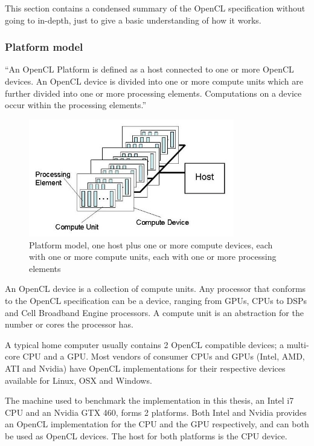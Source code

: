 This section contains a condensed summary of the OpenCL specification without
going to in-depth, just to give a basic understanding of how it works.

\subsubsection{Platform model}

``An OpenCL Platform is defined as a host connected to one or more OpenCL
devices. An OpenCL device is divided into one or more compute units which are
further divided into one or more processing elements. Computations on a device
occur within the processing elements.'' \cite{cl-spec}

\begin{figure}
  \centering
  \includegraphics[width=0.8\textwidth]{images/platform-model.png}
  \caption{Platform model, one host plus one or more compute devices,
    each with one or more compute units, each with one or more
    processing elements}
  \label{platform-model-figure}
\end{figure}

An OpenCL device is a collection of compute units. Any processor that conforms
to the OpenCL specification can be a device, ranging from GPUs, CPUs to DSPs
and Cell Broadband Engine processors. A compute unit is an abstraction for the
number or cores the processor has.

A typical home computer usually contains 2 OpenCL compatible devices; a multi-
core CPU and a GPU. Most vendors of consumer CPUs and GPUs (Intel, AMD, ATI
and Nvidia) have OpenCL implementations for their respective devices available
for Linux, OSX and Windows.

The machine used to benchmark the implementation in this thesis, an Intel i7
CPU and an Nvidia GTX 460, forms 2 platforms. Both Intel and Nvidia provides
an OpenCL implementation for the CPU and the GPU respectively, and can both be
used as OpenCL devices. The host for both platforms is the CPU device.


